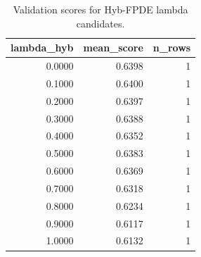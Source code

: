 \begin{table}[t]
\caption{Validation scores for Hyb-FPDE lambda candidates.}
\label{tab:lambda_distribution_computed}
\centering
\begin{tabular}{rrr}
\toprule
lambda\_hyb & mean\_score & n\_rows \\
\midrule
0.0000 & 0.6398 & 1 \\
0.1000 & 0.6400 & 1 \\
0.2000 & 0.6397 & 1 \\
0.3000 & 0.6388 & 1 \\
0.4000 & 0.6352 & 1 \\
0.5000 & 0.6383 & 1 \\
0.6000 & 0.6369 & 1 \\
0.7000 & 0.6318 & 1 \\
0.8000 & 0.6234 & 1 \\
0.9000 & 0.6117 & 1 \\
1.0000 & 0.6132 & 1 \\
\bottomrule
\end{tabular}

\end{table}

